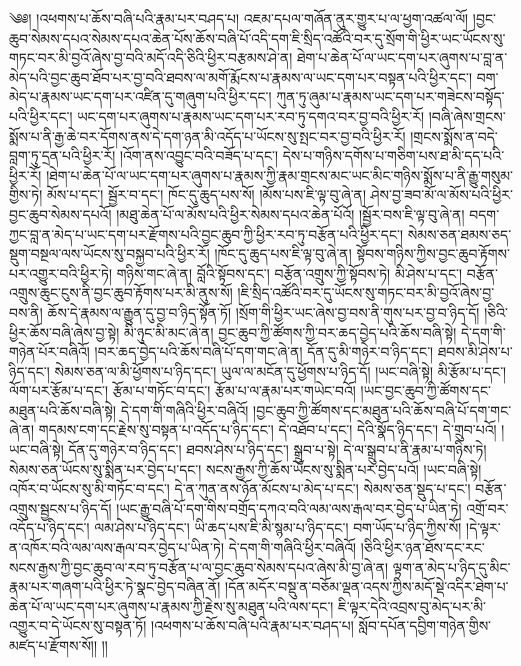 \setcounter{footnote}{0} 
༄༅། །འཕགས་པ་ཆོས་བཞི་པའི་རྣམ་པར་བཤད་པ། འཇམ་དཔལ་གཞོན་ནུར་གྱུར་པ་ལ་ཕྱག་འཚལ་ལོ། །བྱང་ཆུབ་སེམས་དཔའ་སེམས་དཔའ་ཆེན་པོས་ཆོས་བཞི་པོ་འདི་དག་ཇི་སྲིད་འཚོའི་བར་དུ་སྲོག་གི་ཕྱིར་ཡང་ཡོངས་སུ་གཏང་བར་མི་བྱའོ་ཞེས་བྱ་བའི་མདོ་འདི་ཅིའི་ཕྱིར་བརྩམས་ཤེ་ན། ཐེག་པ་ཆེན་པོ་ལ་ཡང་དག་པར་ཞུགས་པ་བླ་ན་མེད་པའི་བྱང་ཆུབ་ཐོབ་པར་བྱ་བའི་ཐབས་ལ་མགོ་རྨོངས་པ་རྣམས་ལ་ཡང་དག་པར་བསྟན་པའི་ཕྱིར་དང་། བག་མེད་པ་རྣམས་ཡང་དག་པར་འཛིན་དུ་གཞུག་པའི་ཕྱིར་དང་། ཀུན་ཏུ་ཞུམ་པ་རྣམས་ཡང་དག་པར་གཟེངས་བསྟོད་པའི་ཕྱིར་དང་། ཡང་དག་པར་ཞུགས་པ་རྣམས་ཡང་དག་པར་རབ་ཏུ་དགའ་བར་བྱ་བའི་ཕྱིར་རོ། །བཞི་ཞེས་གྲངས་སྨོས་པ་ནི་རྒྱ་ཆེ་བར་དོགས་ནས་དེ་དག་ཉན་མི་འདོད་པ་ཡོངས་སུ་སྤང་བར་བྱ་བའི་ཕྱིར་རོ། །གྲངས་སྨོས་ན་བདེ་བླག་ཏུ་དྲན་པའི་ཕྱིར་རོ། །འོག་ནས་འབྱུང་བའི་བཟོད་པ་དང་། དེས་པ་གཉིས་དགོས་པ་གཅིག་པས་ཐ་མི་དད་པའི་ཕྱིར་རོ། །ཐེག་པ་ཆེན་པོ་ལ་ཡང་དག་པར་ཞུགས་པ་རྣམས་ཀྱི་རྣམ་གྲངས་མང་ཡང་མིང་གཉིས་སྨོས་པ་ནི་རྒྱུ་གསུམ་གྱིས་ཏེ། མོས་པ་དང་། སྦྱོར་བ་དང་། ཁོང་དུ་ཆུད་པས་སོ། །མོས་པས་ཇི་ལྟ་བུ་ཞེ་ན། ཤེས་བྱ་ཟབ་མོ་ལ་མོས་པའི་ཕྱིར་བྱང་ཆུབ་སེམས་དཔའོ། །མཐུ་ཆེན་པོ་ལ་མོས་པའི་ཕྱིར་སེམས་དཔའ་ཆེན་པོའོ། །སྦྱོར་བས་ཇི་ལྟ་བུ་ཞེ་ན། བདག་ཀྱང་བླ་ན་མེད་པ་ཡང་དག་པར་རྫོགས་པའི་བྱང་ཆུབ་ཀྱི་ཕྱིར་རབ་ཏུ་བརྩོན་པའི་ཕྱིར་དང་། སེམས་ཅན་ཐམས་ཅད་སྡུག་བསྔལ་ལས་ཡོངས་སུ་བསྐྱབ་པའི་ཕྱིར་རོ། །ཁོང་དུ་ཆུད་པས་ཇི་ལྟ་བུ་ཞེ་ན། སྟོབས་གཉིས་ཀྱིས་བྱང་ཆུབ་རྟོགས་པར་འགྱུར་བའི་ཕྱིར་ཏེ། གཉིས་གང་ཞེ་ན། བློའི་སྟོབས་དང་། བརྩོན་འགྲུས་ཀྱི་སྟོབས་ཏེ། མི་ཤེས་པ་དང་། བརྩོན་འགྲུས་ཆུང་ངུས་ནི་བྱང་ཆུབ་རྟོགས་པར་མི་ནུས་སོ། །ཇི་སྲིད་འཚོའི་བར་དུ་ཡོངས་སུ་གཏང་བར་མི་བྱའོ་ཞེས་བྱ་བས་ནི། ཆོས་དེ་རྣམས་ལ་རྒྱུན་དུ་བྱ་བ་ཉིད་སྟོན་ཏོ། །སྲོག་གི་ཕྱིར་ཡང་ཞེས་བྱ་བས་ནི་གུས་པར་བྱ་བ་ཉིད་དོ། །ཅིའི་ཕྱིར་ཆོས་བཞི་ཞེས་བྱ་སྟེ། མི་ཉུང་མི་མང་ཞེ་ན། བྱང་ཆུབ་ཀྱི་ཚོགས་ཀྱི་བར་ཆད་བྱེད་པའི་ཆོས་བཞི་སྟེ། དེ་དག་གི་གཉེན་པོར་བཞིའོ། །བར་ཆད་བྱེད་པའི་ཆོས་བཞི་པོ་དག་གང་ཞེ་ན། དོན་དུ་མི་གཉེར་བ་ཉིད་དང་། ཐབས་མི་ཤེས་པ་ཉིད་དང་། སེམས་ཅན་ལ་མི་ཕྱོགས་པ་ཉིད་དང་། ཡུལ་ལ་མངོན་དུ་ཕྱོགས་པ་ཉིད་དོ། །ཡང་བཞི་སྟེ། མི་རྩོམ་པ་དང་། ལོག་པར་རྩོམ་པ་དང་། རྩོམ་པ་གཏོང་བ་དང་། རྩོམ་པ་ལ་རྣམ་པར་གཡེང་བའོ། །ཡང་བྱང་ཆུབ་ཀྱི་ཚོགས་དང་མཐུན་པའི་ཆོས་བཞི་སྟེ། དེ་དག་གི་གཞིའི་ཕྱིར་བཞིའོ། །བྱང་ཆུབ་ཀྱི་ཚོགས་དང་མཐུན་པའི་ཆོས་བཞི་པོ་དག་གང་ཞེ་ན། གདམས་ངག་དང་རྗེས་སུ་བསྟན་པ་འདོད་པ་ཉིད་དང་། དེ་འཐོབ་པ་དང་། དེའི་སྣོད་ཉིད་དང་། དེ་གྲུབ་པའོ། །ཡང་བཞི་སྟེ། དོན་དུ་གཉེར་བ་ཉིད་དང་། ཐབས་ཤེས་པ་ཉིད་དང་། སྒྲུབ་པ་སྟེ། དེ་ལ་སྒྲུབ་པ་ནི་རྣམ་པ་གཉིས་ཏེ། སེམས་ཅན་ཡོངས་སུ་སྨིན་པར་བྱེད་པ་དང་། སངས་རྒྱས་ཀྱི་ཆོས་ཡོངས་སུ་སྨིན་པར་བྱེད་པའོ། །ཡང་བཞི་སྟེ། འཁོར་བ་ཡོངས་སུ་མི་གཏོང་བ་དང་། དེ་ན་ཀུན་ནས་ཉོན་མོངས་པ་མེད་པ་དང་། སེམས་ཅན་སྡུད་པ་དང་། བརྩོན་འགྲུས་སྦྱངས་པ་ཉིད་དོ། །ཡང་རྒྱུ་བཞི་པོ་དག་གིས་བགྲོད་དཀའ་བའི་ལམ་ལས་རྒལ་བར་བྱེད་པ་ཡིན་ཏེ། འགྲོ་བར་འདོད་པ་ཉིད་དང་། ལམ་ཤེས་པ་ཉིད་དང་། ཡི་ཆད་པས་ཇི་མི་སྙམ་པ་ཉིད་དང་། བག་ཡོད་པ་ཉིད་ཀྱིས་སོ། །དེ་ལྟར་ན་འཁོར་བའི་ལམ་ལས་རྒལ་བར་བྱེད་པ་ཡིན་ཏེ། དེ་དག་གི་གཞིའི་ཕྱིར་བཞིའོ། །ཅིའི་ཕྱིར་ཉན་ཐོས་དང་རང་སངས་རྒྱས་ཀྱི་བྱང་ཆུབ་ལ་རབ་ཏུ་བརྩོན་པ་ལ་བྱང་ཆུབ་སེམས་དཔའ་ཞེས་མི་བྱ་ཞེ་ན། ལྟག་ན་མེད་པ་ཉིད་དུ་མིང་རྣམ་པར་གཞག་པའི་ཕྱིར་ཏེ་སྣང་བྱེད་བཞིན་ནོ། །དོན་མདོར་བསྡུ་ན་བཅོམ་ལྡན་འདས་ཀྱིས་མདོ་སྡེ་འདིར་ཐེག་པ་ཆེན་པོ་ལ་ཡང་དག་པར་ཞུགས་པ་རྣམས་ཀྱི་རྗེས་སུ་མཐུན་པའི་ལས་དང་། ཇི་ལྟར་དེའི་འབྲས་བུ་མེད་པར་མི་འགྱུར་བ་དེ་ཡོངས་སུ་བསྟན་ཏོ། །འཕགས་པ་ཆོས་བཞི་པའི་རྣམ་པར་བཤད་པ། སློབ་དཔོན་དབྱིག་གཉེན་གྱིས་མཛད་པ་རྫོགས་སོ།། །།